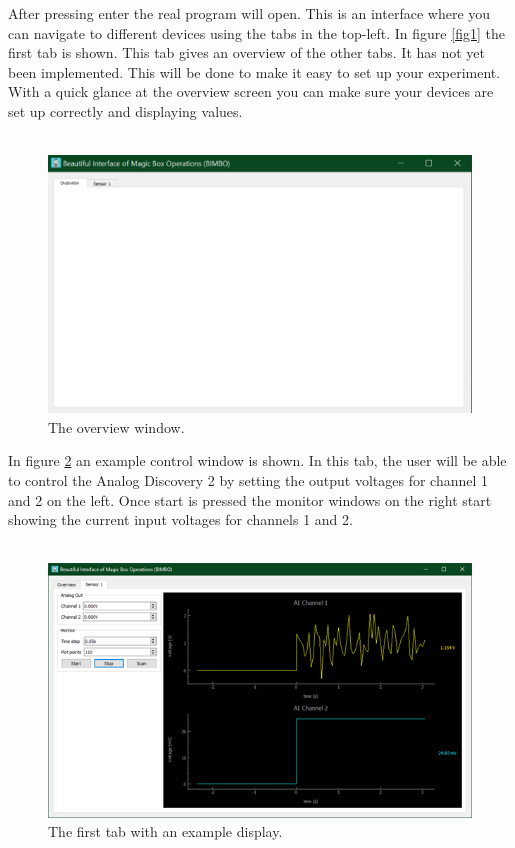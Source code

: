 \documentclass[a4paper]{article}
\begin{document}
\indent After pressing enter the real program will open. This is an interface where you can navigate to different devices using the tabs in the top-left. In figure \ref{fig1} the first tab is shown. This tab gives an overview of the other tabs. It has not yet been implemented. This will be done to make it easy to set up your experiment. With a quick glance at the overview screen you can make sure your devices are set up correctly and displaying values.\\\\

\begin{figure}[h]
	\centering
	\includegraphics[width=0.7 \textwidth]{overview.png}
	\caption{\label{fig2} The overview window.}
\end{figure}

\indent In figure \ref{fig3} an example control window is shown. In this tab, the user will be able to control the Analog Discovery 2 by setting the output voltages for channel 1 and 2 on the left. Once start is pressed the monitor windows on the right start showing the current input voltages for channels 1 and 2.\\\\ 

\begin{figure}[h]
	\centering
	\includegraphics[width=0.7 \textwidth]{tab1.png}
	\caption{\label{fig3} The first tab with an example display.}
\end{figure}
\end{document}
